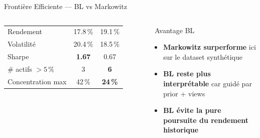 \documentclass[aspectratio=169, 10pt, t]{beamer}
\begin{document}
\begin{frame}[t]{Frontière Efficiente — BL vs Markowitz}
\begin{columns}[c]
\begin{tabular}{@{}lcc@{}}
        \midrule
        Rendement & 17.8\,\% & 19.1\,\% \\
        Volatilité & 20.4\,\% & 18.5\,\% \\
        Sharpe & \textbf{1.67} & 0.67 \\
        \midrule
        \# actifs $> 5\,\%$ & 3 & \textbf{6} \\
        Concentration max & 42\,\% & \textbf{24\,\%} \\
        \bottomrule
      \end{tabular}
      \vspace{0.5em}
      \begin{alertblock}{\small\faStar\ Avantage BL}
        \small
        \begin{itemize}
          \setlength{\itemsep}{3pt}
          \item \textbf{Markowitz surperforme} ici sur le dataset synthétique
          \item \textbf{BL reste plus interprétable} car guidé par prior + views
          \item \textbf{BL évite la pure poursuite du rendement historique}
        \end{itemize}
      \end{alertblock}
  \end{columns}
\end{frame}
\end{document}
